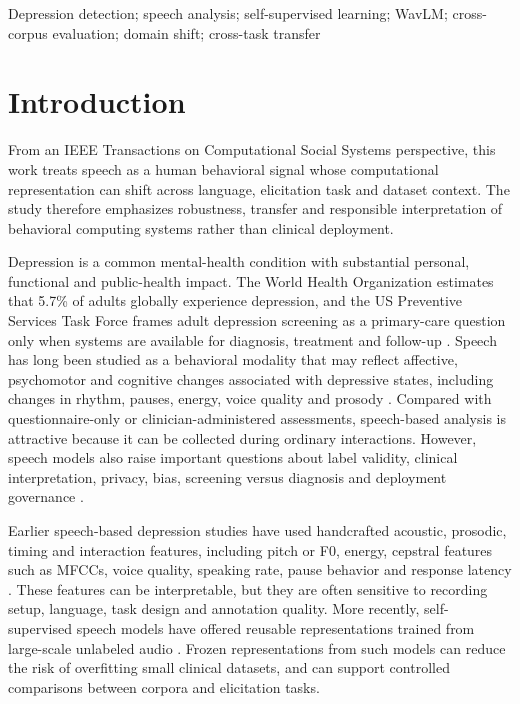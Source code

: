 \documentclass[lettersize,journal]{IEEEtran}
\begin{document}
\begin{IEEEkeywords}
Depression detection; speech analysis; self-supervised learning; WavLM; cross-corpus evaluation; domain shift; cross-task transfer
\end{IEEEkeywords}

\section{Introduction}

From an IEEE Transactions on Computational Social Systems perspective, this work treats speech as a human behavioral signal whose computational representation can shift across language, elicitation task and dataset context. The study therefore emphasizes robustness, transfer and responsible interpretation of behavioral computing systems rather than clinical deployment.

Depression is a common mental-health condition with substantial personal, functional and public-health impact. The World Health Organization estimates that 5.7\% of adults globally experience depression, and the US Preventive Services Task Force frames adult depression screening as a primary-care question only when systems are available for diagnosis, treatment and follow-up \cite{who2025depression,uspstf2023depressionScreening}. Speech has long been studied as a behavioral modality that may reflect affective, psychomotor and cognitive changes associated with depressive states, including changes in rhythm, pauses, energy, voice quality and prosody \cite{leal2025survey,tao2023featureCorrelation}. Compared with questionnaire-only or clinician-administered assessments, speech-based analysis is attractive because it can be collected during ordinary interactions. However, speech models also raise important questions about label validity, clinical interpretation, privacy, bias, screening versus diagnosis and deployment governance \cite{who2021aiHealthEthics,nist2023aiRmf,nautsch2019gdprSpeech,kelly2019clinicalImpactAI}.

Earlier speech-based depression studies have used handcrafted acoustic, prosodic, timing and interaction features, including pitch or F0, energy, cepstral features such as MFCCs, voice quality, speaking rate, pause behavior and response latency \cite{leal2025survey,valstar2016avec,tao2023featureCorrelation}. These features can be interpretable, but they are often sensitive to recording setup, language, task design and annotation quality. More recently, self-supervised speech models have offered reusable representations trained from large-scale unlabeled audio \cite{baevski2020wav2vec2,chen2022wavlm,yang2021superb}. Frozen representations from such models can reduce the risk of overfitting small clinical datasets, and can support controlled comparisons between corpora and elicitation tasks.
\end{document}
